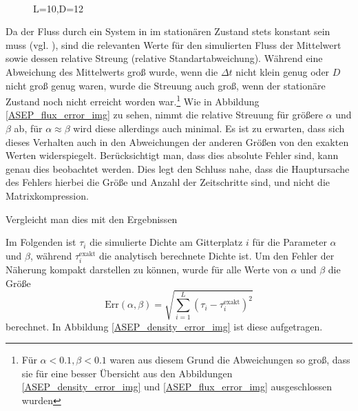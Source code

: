 \documentclass[10pt,a4paper]{report}
\begin{document}
\begin{figure}
\centering
{}
\\
\label{ASEP_error_img}
\caption{L=10,D=12}
\end{figure}


Da der Fluss durch ein System in im stationären Zustand stets konstant sein muss (vgl. \cite{ASEP}), sind die relevanten Werte für den simulierten Fluss der Mittelwert sowie dessen relative Streung (relative Standartabweichung). Während eine Abweichung des Mittelwerts groß wurde, wenn die $\Delta t$ nicht klein genug oder $D$ nicht groß genug waren, wurde die Streuung auch groß, wenn der stationäre Zustand noch nicht erreicht worden war.\footnote{Für $\alpha<0.1,\beta<0.1$ waren aus diesem Grund die Abweichungen so groß, dass sie für eine besser Übersicht aus den Abbildungen \ref{ASEP_density_error_img} und \ref{ASEP_flux_error_img} ausgeschlossen wurden} Wie in Abbildung \ref{ASEP_flux_error_img} zu sehen, nimmt die relative Streuung für größere $\alpha$ und $\beta$ ab, für $\alpha\approx\beta$ wird diese allerdings auch minimal. Es ist zu erwarten, dass sich dieses Verhalten auch in den Abweichungen der anderen Größen von den exakten Werten widerspiegelt. Berücksichtigt man, dass dies absolute Fehler sind, kann genau dies beobachtet werden. Dies legt den Schluss nahe, dass die Hauptursache des Fehlers hierbei die Größe und Anzahl der Zeitschritte sind, und nicht die Matrixkompression.


Vergleicht man dies mit den Ergebnissen 

Im Folgenden ist $\tau_i$ die simulierte Dichte am Gitterplatz $i$ für die Parameter $\alpha$ und $\beta$, während $\tau_i^{\text{exakt}}$ die analytisch berechnete Dichte ist. Um den Fehler der Näherung kompakt darstellen zu können, wurde für alle Werte von $\alpha$ und $\beta$ die Größe
\begin{equation}
\text{Err}(\alpha,\beta)=\sqrt{\sum_{i=1}^L (\tau_i-\tau_i^{\text{exakt}})^2}
\end{equation}
berechnet. In Abbildung \ref{ASEP_density_error_img} ist diese aufgetragen.
\end{document}
